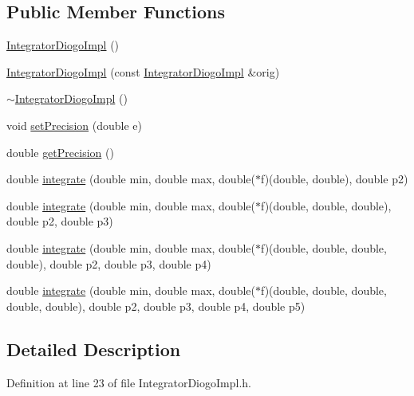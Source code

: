 \subsection*{Public Member Functions}
\begin{DoxyCompactItemize}
\item 
\hyperlink{class_integrator_diogo_impl_ab5115cc00685f6e88e1b93dca5c2e3f2}{Integrator\-Diogo\-Impl} ()
\item 
\hyperlink{class_integrator_diogo_impl_ab5c47c303ec5da8fa3f1ff81e860b0bb}{Integrator\-Diogo\-Impl} (const \hyperlink{class_integrator_diogo_impl}{Integrator\-Diogo\-Impl} \&orig)
\item 
\hyperlink{class_integrator_diogo_impl_ab1923d54c4e14989a50d35a284275d7e}{$\sim$\-Integrator\-Diogo\-Impl} ()
\item 
void \hyperlink{class_integrator_diogo_impl_a593dae7440dc93215a553eb9fcccb208}{set\-Precision} (double e)
\item 
double \hyperlink{class_integrator_diogo_impl_acf41eec88194f5608b5944f146f82485}{get\-Precision} ()
\item 
double \hyperlink{class_integrator_diogo_impl_af3740a486a6dc3a4d8f00c65e4cae5bf}{integrate} (double min, double max, double($\ast$f)(double, double), double p2)
\item 
double \hyperlink{class_integrator_diogo_impl_a0fffce07bcb47ef1ace65bca9558ea40}{integrate} (double min, double max, double($\ast$f)(double, double, double), double p2, double p3)
\item 
double \hyperlink{class_integrator_diogo_impl_a3fff07d4ad305d8cf3497dfcf0fc8b27}{integrate} (double min, double max, double($\ast$f)(double, double, double, double), double p2, double p3, double p4)
\item 
double \hyperlink{class_integrator_diogo_impl_aeb94cfb905b89b89077ffe00a25b470f}{integrate} (double min, double max, double($\ast$f)(double, double, double, double, double), double p2, double p3, double p4, double p5)
\end{DoxyCompactItemize}


\subsection{Detailed Description}


Definition at line 23 of file Integrator\-Diogo\-Impl.\-h.



